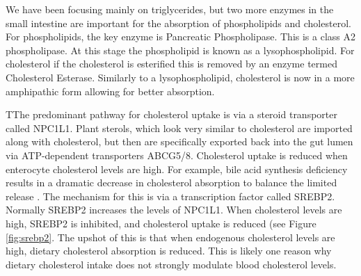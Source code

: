 \documentclass{tufte-handout}
\begin{document}
  We have been focusing mainly on triglycerides, but two more enzymes in the small intestine are important for the absorption of phospholipids and cholesterol.  For phospholipids, the key enzyme is Pancreatic Phospholipase.  This is a class A2 phospholipase.  At this stage the phospholipid is known as a lysophospholipid.  For cholesterol if the cholesterol is esterified this is removed by an enzyme termed Cholesterol Esterase.  Similarly to a lysophospholipid, cholesterol is now in a more amphipathic form allowing for better absorption.


  TThe predominant pathway for cholesterol uptake is via a steroid transporter called NPC1L1\citep{Altmann2004,Iqbal2005}.  Plant sterols, which look very similar to cholesterol are imported along with cholesterol, but then are specifically exported back into the gut lumen via ATP-dependent transporters ABCG5/8.  Cholesterol uptake is reduced when enterocyte cholesterol levels are high. For example, bile acid synthesis deficiency results in a dramatic decrease in cholesterol absorption to balance the limited release \citep{Repa2000,Wang2007d}.  The mechanism for this is via a transcription factor called SREBP2.  Normally SREBP2 increases the levels of NPC1L1.  When cholesterol levels are high, SREBP2 is inhibited, and cholesterol uptake is reduced (see Figure \ref{fig:srebp2}.  The upshot of this is that when endogenous cholesterol levels are high, dietary cholesterol absorption is reduced.  This is likely one reason why dietary cholesterol intake does not strongly modulate blood cholesterol levels.
\end{document}
